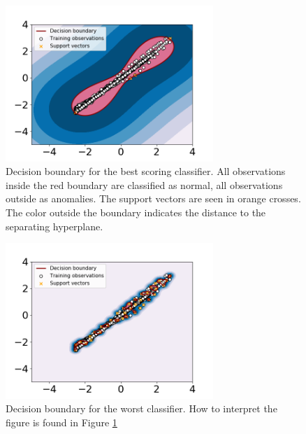                 \begin{figure}
                        \centering
                        \includegraphics[width=0.7\textwidth]{report/figures/analysis/gridsearch/Novelty detection, 1, training, gamma = 0.05 nu = 1.0583130489998942e-05.png}
                        \caption{Decision boundary for the best scoring classifier. All observations inside the red boundary are classified as normal, all observations outside as anomalies. The support vectors are seen in orange crosses. The color outside the boundary indicates the distance to the separating hyperplane.}
                        \label{fig:svm_grid_best}
                        
                \end{figure}
                
                \begin{figure}
                        \centering
                        \includegraphics[width=0.7\textwidth]{report/figures/analysis/gridsearch/Novelty detection, -1 training, gamma = 16 nu = 4.233252195999577e-06.png}
                        \caption{Decision boundary for the worst classifier. How to interpret the figure is found in Figure \ref{fig:svm_grid_best}}
                        \label{fig:svm_grid_wors}
                \end{figure}
    
